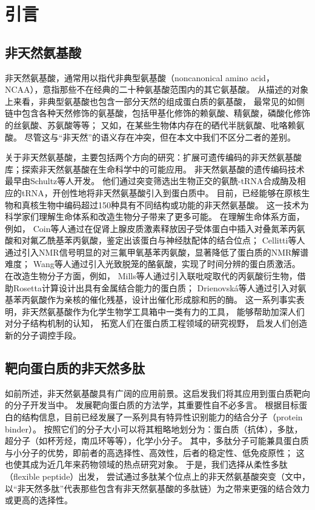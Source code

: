 
\chapter{引言}



\section{非天然氨基酸}

非天然氨基酸，通常用以指代非典型氨基酸（noncanonical amino acid，NCAA），意指那些不在经典的二十种氨基酸范围内的其它氨基酸。
从描述的对象上来看，非典型氨基酸也包含一部分天然的组成蛋白质的氨基酸，
最常见的如侧链中包含各种天然修饰的氨基酸，包括甲基化修饰的赖氨酸、精氨酸，磷酸化修饰的丝氨酸、苏氨酸等等；
又如，在某些生物体内存在的硒代半胱氨酸、吡咯赖氨酸。
尽管这与“非天然”的语义存在冲突，但在本文中我们不区分二者的差别。

关于非天然氨基酸，主要包括两个方向的研究：扩展可遗传编码的非天然氨基酸库；探索非天然氨基酸在生命科学中的可能应用。
非天然氨基酸的遗传编码技术最早由Schultz等人开发。
他们通过突变筛选出生物正交的氨酰-tRNA合成酶及相应的tRNA，开创性地将非天然氨基酸引入到蛋白质中。
目前，已经能够在原核生物和真核生物中编码超过150种具有不同结构或功能的非天然氨基酸。
这一技术为科学家们理解生命体系和改造生物分子带来了更多可能。
在理解生命体系方面，例如，
Coin等人通过在促肾上腺皮质激素释放因子受体蛋白中插入对叠氮苯丙氨酸和对氟乙酰基苯丙氨酸，鉴定出该蛋白与神经肽配体的结合位点；
Cellitti等人通过引入NMR信号明显的对三氟甲氧基苯丙氨酸，显著降低了蛋白质的NMR解谱难度；
Wang等人通过引入光致脱笼的酪氨酸，实现了时间分辨的蛋白质激活。
在改造生物分子方面，例如，
Mills等人通过引入联吡啶取代的丙氨酸衍生物，借助Rosetta计算设计出具有金属结合能力的蛋白质；
Drienovská等人通过引入对氨基苯丙氨酸作为亲核的催化残基，设计出催化形成腙和肟的酶。
这一系列事实表明，非天然氨基酸作为化学生物学工具箱中一类有力的工具，
能够帮助加深人们对分子结构机制的认知，
拓宽人们在蛋白质工程领域的研究视野，
启发人们创造新的分子调控手段。



\section{靶向蛋白质的非天然多肽}

如前所述，非天然氨基酸具有广阔的应用前景。这启发我们将其应用到蛋白质靶向的分子开发当中。
发展靶向蛋白质的方法学，其重要性自不必多言。
根据目标蛋白的结构信息，目前已经发展了一系列具有特异性识别能力的结合分子（protein binder）。
按照它们的分子大小可以将其粗略地划分为：蛋白质（抗体），多肽，超分子（如杯芳烃，南瓜环等等），化学小分子。
其中，多肽分子可能兼具蛋白质与小分子的优势，即前者的高选择性、高效性，后者的稳定性、低免疫原性；
这也使其成为近几年来药物领域的热点研究对象。
于是，我们选择从柔性多肽（flexible peptide）出发，
尝试通过多肽某个位点上的非天然氨基酸突变（文中，以“非天然多肽”代表那些包含有非天然氨基酸的多肽链）为之带来更强的结合效力或更高的选择性。

